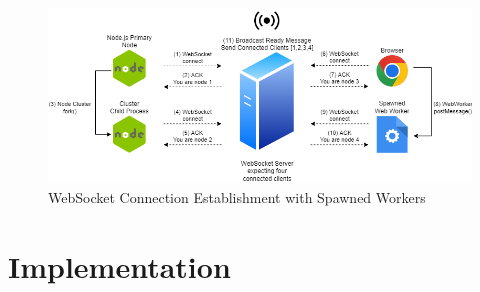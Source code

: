 \documentclass[12pt, a4paper]{report}
\theoremstyle{definition}
\theoremstyle{definition}%
\theoremstyle{definition}%
\theoremstyle{definition}%
\theoremstyle{definition}%
\theoremstyle{definition}%
\begin{document}
\begin{figure}[H]
    \begin{centering}
        \includegraphics[width=\textwidth]{resources/websocketconnectioncomplex.png}
        \caption{WebSocket Connection Establishment with Spawned Workers}
    \end{centering}
\end{figure}

\section{Implementation}
\end{document}
